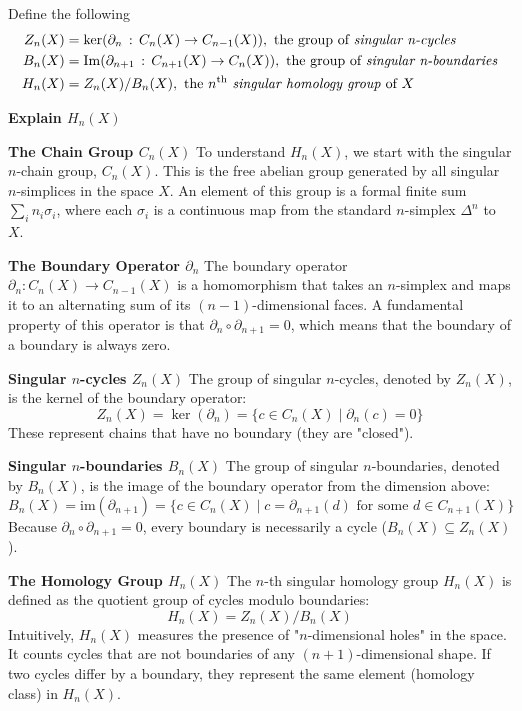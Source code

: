 \documentclass[12pt,a4paper]{report}
\begin{document}
\begin{description}
	\item Define the following
	\begin{align*}
		Z_n(X) &= \ker(\partial_n\,:\, C_n(X) \to C_{n-1}(X)), \text{ the group of \textit{singular n-cycles}}\\
		B_n(X) &= \operatorname{Im}(\partial_{n+1}\,:\, C_{n+1}(X) \to C_{n}(X)), \text{ the group of \textit{singular n-boundaries}}\\
		H_n(X) &= Z_n(X)/B_n(X), \text{ the $n\textsuperscript{th}$ \textit{singular homology group} of $X$}
	\end{align*}

	\textbf{Explain $H_n(X)$}

    \item \textbf{The Chain Group $ C_n(X) $}
To understand $ H_n(X) $, we start with the singular $ n $-chain group, $ C_n(X) $. This is the free abelian group generated by all singular $ n $-simplices in the space $ X $. An element of this group is a formal finite sum $ \sum_i n_i \sigma_i $, where each $ \sigma_i $ is a continuous map from the standard $ n $-simplex $ \Delta^n $ to $ X $.

    \item \textbf{The Boundary Operator $ \partial_n $}
The boundary operator $ \partial_n: C_n(X) \to C_{n-1}(X) $ is a homomorphism that takes an $ n $-simplex and maps it to an alternating sum of its $ (n-1) $-dimensional faces. A fundamental property of this operator is that $ \partial_n \circ \partial_{n+1} = 0 $, which means that the boundary of a boundary is always zero.

    \item \textbf{Singular $ n $-cycles $ Z_n(X) $}
The group of singular $ n $-cycles, denoted by $ Z_n(X) $, is the kernel of the boundary operator:
\[ Z_n(X) = \ker(\partial_n) = \{ c \in C_n(X) \mid \partial_n(c) = 0 \} \]
These represent chains that have no boundary (they are "closed").

    \item \textbf{Singular $ n $-boundaries $ B_n(X) $}
The group of singular $ n $-boundaries, denoted by $ B_n(X) $, is the image of the boundary operator from the dimension above:
\[ B_n(X) = \text{im}(\partial_{n+1}) = \{ c \in C_n(X) \mid c = \partial_{n+1}(d) \text{ for some } d \in C_{n+1}(X) \} \]
Because $ \partial_n \circ \partial_{n+1} = 0 $, every boundary is necessarily a cycle ($ B_n(X) \subseteq Z_n(X) $).

    \item \textbf{The Homology Group $ H_n(X) $}
The $ n $-th singular homology group $ H_n(X) $ is defined as the quotient group of cycles modulo boundaries:
\[ H_n(X) = Z_n(X) / B_n(X) \]
Intuitively, $ H_n(X) $ measures the presence of "$ n $-dimensional holes" in the space. It counts cycles that are not boundaries of any $ (n+1) $-dimensional shape. If two cycles differ by a boundary, they represent the same element (homology class) in $ H_n(X) $.
\end{description}
\end{document}
